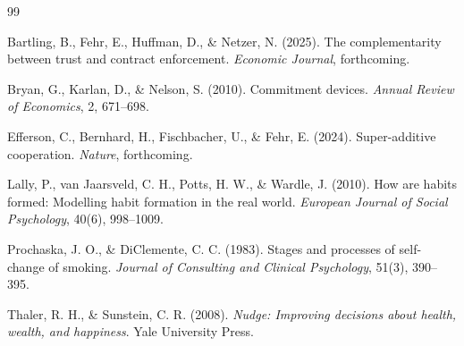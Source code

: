 \documentclass[12pt]{article}
\begin{document}
\begin{thebibliography}{99}

Bartling, B., Fehr, E., Huffman, D., \& Netzer, N. (2025).
The complementarity between trust and contract enforcement.
\textit{Economic Journal}, forthcoming.

Bryan, G., Karlan, D., \& Nelson, S. (2010).
Commitment devices.
\textit{Annual Review of Economics}, 2, 671--698.

Efferson, C., Bernhard, H., Fischbacher, U., \& Fehr, E. (2024).
Super-additive cooperation.
\textit{Nature}, forthcoming.

Lally, P., van Jaarsveld, C. H., Potts, H. W., \& Wardle, J. (2010).
How are habits formed: Modelling habit formation in the real world.
\textit{European Journal of Social Psychology}, 40(6), 998--1009.

Prochaska, J. O., \& DiClemente, C. C. (1983).
Stages and processes of self-change of smoking.
\textit{Journal of Consulting and Clinical Psychology}, 51(3), 390--395.

Thaler, R. H., \& Sunstein, C. R. (2008).
\textit{Nudge: Improving decisions about health, wealth, and happiness}.
Yale University Press.

\end{thebibliography}
\end{document}

